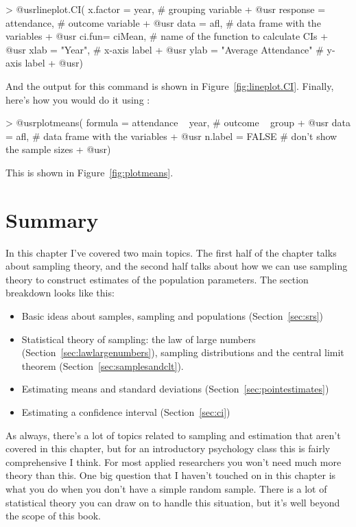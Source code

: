 \begin{rblock1}
> @usr{lineplot.CI( x.factor = year,}            # grouping variable 
+ @usr{             response = attendance, }     # outcome variable
+ @usr{             data = afl, }                # data frame with the variables
+ @usr{             ci.fun= ciMean,}             # name of the function to calculate CIs
+ @usr{             xlab = "Year", }             # x-axis label
+ @usr{             ylab = "Average Attendance"} # y-axis label
+ @usr{)}
\end{rblock1}
And the output for this command is shown in Figure~\ref{fig:lineplot.CI}.  Finally, here's how you would do it using :
\begin{rblock1}
> @usr{plotmeans( formula = attendance ~ year,}  # outcome ~ group 
+ @usr{           data = afl,     }              # data frame with the variables
+ @usr{           n.label = FALSE}               # don't show the sample sizes
+ @usr{)}
\end{rblock1}
This is shown in Figure~\ref{fig:plotmeans}.


\section{Summary}

In this chapter I've covered two main topics. The first half of the chapter talks about sampling theory, and the second half talks about how we can use sampling theory to construct estimates of the population parameters. The section breakdown looks like this:

\begin{itemize} \itemsep -2pt
\item Basic ideas about samples, sampling and populations (Section~\ref{sec:srs})
\item Statistical theory of sampling: the law of large numbers (Section~\ref{sec:lawlargenumbers}), sampling distributions and the central limit theorem (Section~\ref{sec:samplesandclt}).
\item Estimating means and standard deviations (Section~\ref{sec:pointestimates})
\item Estimating a confidence interval (Section~\ref{sec:ci})
\end{itemize}

\noindent
As always, there's a lot of topics related to sampling and estimation that aren't covered in this chapter, but for an introductory psychology class this is fairly comprehensive I think. For most applied researchers you won't need much more theory than this. One big question that I haven't touched on in this chapter is what you do when you don't have a simple random sample. There is a lot of statistical theory you can draw on to handle this situation, but it's well beyond the scope of this book.

